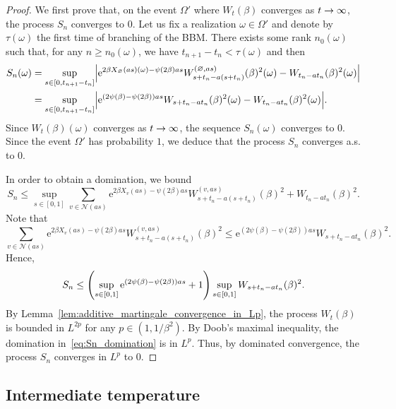 \documentclass[10pt]{amsart}
\theoremstyle{definition}\newtheorem{defi}[theo]{Definition}\newtheorem{rema}[theo]{Remark}\newtheorem{exam}[theo]{Example}\newtheorem{exem}[theo]{Example}\newtheorem{nota}[theo]{Notation}
\newcommand{\e}{\mathrm{e}}
\newcommand\1{\mathds{1}}
\newcommand{\cN}{\mathcal{N}}
\let\originalleft\left
\let\originalright\right
\renewcommand{\left}{\mathopen{}\mathclose\bgroup\originalleft}
\renewcommand{\right}{\aftergroup\egroup\originalright}
\renewcommand*{\to}{\mathchoice{\longrightarrow}{\rightarrow}{\rightarrow}{\rightarrow}}
\begin{document}
\begin{proof}
We first prove that, on the event $\Omega'$ where $W_t(\beta)$ converges as $t \to \infty$, the process $S_n$ converges to $0$. Let us fix a realization $\omega \in \Omega'$ and denote by $\tau(\omega)$ the first time of branching of the BBM. There exists some rank $n_0(\omega)$ such that, for any $n \geq n_0(\omega)$, we have $t_{n+1} - t_n < \tau(\omega)$ and then
\begin{align*}
S_n(\omega) &= \sup_{s \in [0, t_{n+1} - t_n]} \left|\e^{2\beta X_\varnothing(as)(\omega) - \psi(2\beta)as} W_{s + t_n - a(s + t_n)}^{(\varnothing, as)}(\beta)^2(\omega) - W_{t_n - at_n}(\beta)^2(\omega)\right|\\
&= \sup_{s \in [0, t_{n+1} - t_n]} \left|\e^{(2\psi(\beta) - \psi(2\beta))as} W_{s + t_n - at_n}(\beta)^2(\omega) - W_{t_n - at_n}(\beta)^2(\omega)\right|. 
\end{align*}
Since $W_t(\beta)(\omega)$ converges as $t \to \infty$, the sequence $S_n(\omega)$ converges to $0$. Since the event $\Omega'$ has probability $1$, we deduce that the process $S_n$ converges a.s. to $0$.

In order to obtain a domination, we bound
\begin{equation*}
S_n \leq \sup_{s \in [0, 1]} \sum_{v \in \cN(as)} \e^{2\beta X_v(as) - \psi(2\beta)as} W_{s + t_n - a(s + t_n)}^{(v, as)}(\beta)^2 + W_{t_n - at_n}(\beta)^2.
\end{equation*}
Note that
\begin{equation*}
\sum_{v \in \cN(as)} \e^{2\beta X_v(as) - \psi(2\beta)as} W_{s + t_n - a(s + t_n)}^{(v, as)}(\beta)^2 \leq \e^{(2\psi(\beta) - \psi(2\beta))as} W_{s + t_n - at_n}(\beta)^2.
\end{equation*}
Hence,
\begin{equation}\label{eq:Sn_domination}
S_n \leq \left(\sup_{s \in [0, 1]} \e^{(2\psi(\beta) - \psi(2\beta))as} + 1\right) \sup_{s \in [0, 1]} W_{s + t_n - at_n}(\beta)^2.
\end{equation}
By Lemma~\ref{lem:additive_martingale_convergence_in_Lp}, the process $W_t(\beta)$ is bounded in $L^{2p}$ for any $p \in (1, 1/\beta^2)$. By Doob's maximal inequality, the domination in~\eqref{eq:Sn_domination} is in $L^p$. Thus, by dominated convergence, the process $S_n$ converges in $L^p$ to $0$.
\end{proof}

\subsection{Intermediate temperature}
\end{document}
